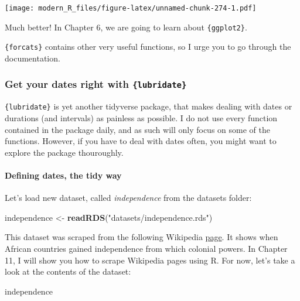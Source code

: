 \documentclass[]{gitbook}
\newenvironment{Shaded}{\begin{snugshade}}{\end{snugshade}}
\newcommand{\KeywordTok}[1]{\textcolor[rgb]{0.13,0.29,0.53}{\textbf{#1}}}
\newcommand{\NormalTok}[1]{#1}
\newcommand{\StringTok}[1]{\textcolor[rgb]{0.31,0.60,0.02}{#1}}
\let\oldparagraph\paragraph
\renewcommand{\paragraph}[1]{\oldparagraph{#1}\mbox{}}
\theoremstyle{definition}
\theoremstyle{definition}
\theoremstyle{definition}
\theoremstyle{remark}
\begin{document}
\texttt{[image: modern\_R\_files/figure-latex/unnamed-chunk-274-1.pdf]}

Much better! In Chapter 6, we are going to learn about
\texttt{\{ggplot2\}}.

\texttt{\{forcats\}} contains other very useful functions, so I urge you
to go through the documentation.

\hypertarget{get-your-dates-right-with-lubridate}{%
\subsubsection{\texorpdfstring{Get your dates right with
\texttt{\{lubridate\}}}{Get your dates right with \{lubridate\}}}\label{get-your-dates-right-with-lubridate}}

\texttt{\{lubridate\}} is yet another tidyverse package, that makes
dealing with dates or durations (and intervals) as painless as possible.
I do not use every function contained in the package daily, and as such
will only focus on some of the functions. However, if you have to deal
with dates often, you might want to explore the package thouroughly.

\hypertarget{defining-dates-the-tidy-way}{%
\paragraph{Defining dates, the tidy
way}\label{defining-dates-the-tidy-way}}

Let's load new dataset, called \emph{independence} from the datasets
folder:

\begin{Shaded}
\begin{Highlighting}[]
\NormalTok{independence <-}\StringTok{ }\KeywordTok{readRDS}\NormalTok{(}\StringTok{"datasets/independence.rds"}\NormalTok{)}
\end{Highlighting}
\end{Shaded}

This dataset was scraped from the following Wikipedia
\href{https://en.wikipedia.org/wiki/Decolonisation_of_Africa\#Timeline}{page}.
It shows when African countries gained independence from which colonial
powers. In Chapter 11, I will show you how to scrape Wikipedia pages
using R. For now, let's take a look at the contents of the dataset:

\begin{Shaded}
\begin{Highlighting}[]
\NormalTok{independence}
\end{Highlighting}
\end{Shaded}
\end{document}
